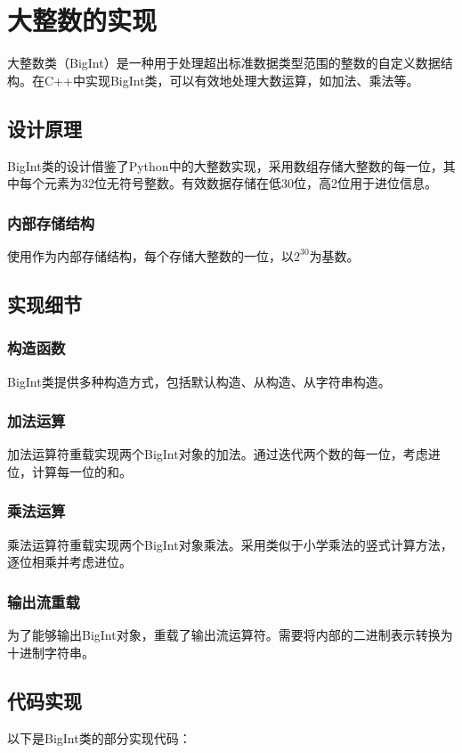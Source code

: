 \chapter{大整数的实现}
大整数类（BigInt）是一种用于处理超出标准数据类型范围的整数的自定义数据结构。在C++中实现BigInt类，可以有效地处理大数运算，如加法、乘法等。

\section{设计原理}
BigInt类的设计借鉴了Python中的大整数实现，采用数组存储大整数的每一位，其中每个元素为32位无符号整数。有效数据存储在低30位，高2位用于进位信息。

\subsection{内部存储结构}
使用作为内部存储结构，每个存储大整数的一位，以$2^{30}$为基数。

\section{实现细节}
\subsection{构造函数}
BigInt类提供多种构造方式，包括默认构造、从构造、从字符串构造。

\subsection{加法运算}
加法运算符重载实现两个BigInt对象的加法。通过迭代两个数的每一位，考虑进位，计算每一位的和。

\subsection{乘法运算}
乘法运算符重载实现两个BigInt对象乘法。采用类似于小学乘法的竖式计算方法，逐位相乘并考虑进位。

\subsection{输出流重载}
为了能够输出BigInt对象，重载了输出流运算符\cppinline{<<}。需要将内部的二进制表示转换为十进制字符串。

\section{代码实现}
以下是BigInt类的部分实现代码：

